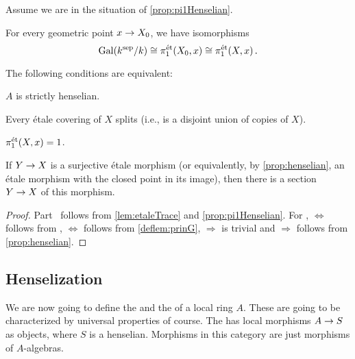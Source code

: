 \begin{cor}
	Assume we are in the situation of \cref{prop:pi1Henselian}.
	\begin{alphanumerate}
		\item For every geometric point $x\morphism X_0$, we have isomorphisms
		\begin{equation*}
			\operatorname{Gal}(k^{\mathrm{sep}}/k)\cong \pi_1^{\mathrm{\acute{e}t}}(X_0,x)\cong \pi_1^{\mathrm{\acute{e}t}}(X,x)\,.
		\end{equation*}
		\item The following conditions are equivalent:
		\begin{numerate}
			\item $A$ is strictly henselian.
			\item Every étale covering of $X$ splits (i.e., is a disjoint union of copies of $X$).
			\item $\pi_1^{\mathrm{\acute{e}t}}(X,x)=1$.
			\item If $Y\morphism X$ is a surjective étale morphism (or equivalently, by \cref{prop:henselian}, an étale morphism with the closed point in its image), then there is a section $Y\morphism X$ of this morphism.
		\end{numerate}
	\end{alphanumerate}
\end{cor}
\begin{proof}
	Part~ follows from \cref{lem:etaleTrace} and \cref{prop:pi1Henselian}. For ,  $\Leftrightarrow$  follows from ,  $\Leftrightarrow$  follows from \cref{deflem:prinG},  $\Rightarrow$  is trivial and  $\Rightarrow$  follows from \cref{prop:henselian}.
\end{proof}
\subsection{Henselization}
We are now going to define the  and the  of a local ring $A$. These are going to be characterized by universal properties of course. The  has local morphisms $A\morphism S$ as objects, where $S$ is a henselian. Morphisms in this category are just morphisms of $A$-algebras.

